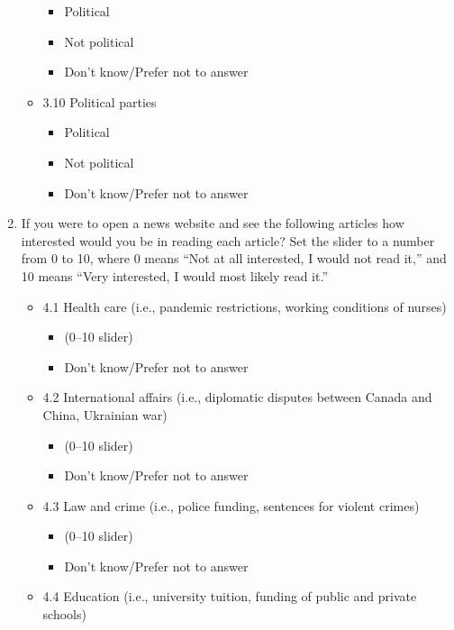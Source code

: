 \documentclass[
  letterpaper,
  DIV=11,
  numbers=noendperiod]{scrreprt}
\providecommand{\tightlist}{%
  \setlength{\itemsep}{0pt}\setlength{\parskip}{0pt}}\usepackage{longtable,booktabs,array}
\begin{document}
\begin{enumerate}
\begin{itemize}
    \begin{itemize}
    \tightlist
    \item
      Political
    \item
      Not political
    \item
      Don't know/Prefer not to answer
    \end{itemize}
  \item
    3.10 Political parties

    \begin{itemize}
    \tightlist
    \item
      Political
    \item
      Not political
    \item
      Don't know/Prefer not to answer
    \end{itemize}
  \end{itemize}
\item
  If you were to open a news website and see the following articles how
  interested would you be in reading each article? Set the slider to a
  number from 0 to 10, where 0 means ``Not at all interested, I would
  not read it,'' and 10 means ``Very interested, I would most likely
  read it.''

  \begin{itemize}
  \tightlist
  \item
    4.1 Health care (i.e., pandemic restrictions, working conditions of
    nurses)

    \begin{itemize}
    \tightlist
    \item
      (0--10 slider)
    \item
      Don't know/Prefer not to answer
    \end{itemize}
  \item
    4.2 International affairs (i.e., diplomatic disputes between Canada
    and China, Ukrainian war)

    \begin{itemize}
    \tightlist
    \item
      (0--10 slider)
    \item
      Don't know/Prefer not to answer
    \end{itemize}
  \item
    4.3 Law and crime (i.e., police funding, sentences for violent
    crimes)

    \begin{itemize}
    \tightlist
    \item
      (0--10 slider)
    \item
      Don't know/Prefer not to answer
    \end{itemize}
  \item
    4.4 Education (i.e., university tuition, funding of public and
    private schools)


\end{itemize}
\end{enumerate}
\end{document}
